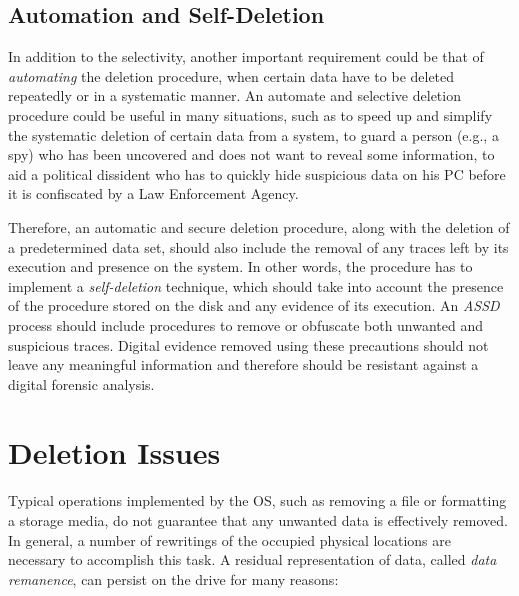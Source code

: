 \documentclass[conference]{IEEEtran}
\newcommand{\assd}{\emph{ASSD}\xspace}
\begin{document}
\subsection{Automation and Self-Deletion}
In addition to the selectivity, another important requirement could be that of \textit{automating} the deletion procedure, when certain data have to be deleted repeatedly or in a systematic manner. An automate and selective deletion procedure could be useful in many situations, such as to speed up and simplify the systematic deletion of certain data from a system, to guard a person (e.g., a spy) who has been uncovered and does not want to reveal some information, to aid a political dissident who has to quickly hide suspicious data on his PC before it is confiscated by a Law Enforcement Agency.

Therefore, an automatic and secure deletion procedure, along with the deletion of a predetermined data set, should also include the removal of any traces left by its execution and presence on the system. In other words, the procedure has to implement a \textit{self-deletion} technique, which should take into account the presence of the procedure stored on the disk and any evidence of its execution. An \assd process should include procedures to remove or obfuscate both unwanted and suspicious traces.
Digital evidence removed using these precautions should not leave any meaningful information and therefore should be resistant against a digital forensic analysis.


\section{Deletion Issues}
Typical operations implemented by the OS, such as removing a file or formatting a storage media, do not guarantee that any unwanted data is effectively removed.
In general, a number of rewritings of the occupied physical locations are necessary to accomplish this task.
A residual representation of data, called \textit{data remanence}, can persist on the drive for many reasons:
\end{document}
